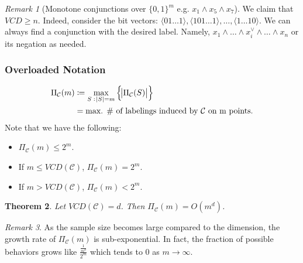 \documentclass[12pt, letterpaper]{article}
\numberwithin{equation}{section} %
\newcommand{\mc}{\mathcal}
\newtheorem{theorem}{Theorem}[section]
\theoremstyle{definition}
\theoremstyle{remark}
\newtheorem{remark}[theorem]{Remark}
\begin{document}
\begin{remark}[Monotone conjunctions over $\lbrace 0,1 \rbrace^m$ e.g. $x_1\land x_5\land x_7$]
    We claim that $VCD \geq n$. Indeed, consider the bit vectors: $\langle01\ldots 1\rangle, \langle 101\ldots 1\rangle, \ldots, \langle1\ldots 10\rangle$. We can always find a conjunction with the desired label. Namely, $x_1\land\ldots \land x_i^\lor\land\ldots\land x_n$ or its negation as needed.
\end{remark}

\subsubsection*{Overloaded Notation}
\begin{align}
    \Pi_{\mc C}(m) &\coloneqq \max\limits_{S\;:\;\abs{S}= m}\left\{\abs{\Pi_{\mc C}(S)}\right\}\\
    &= \textrm{max. \# of labelings induced by $\mc C$ on m points.}
\end{align}
Note that we have the following:
\begin{itemize}
    \item  $\Pi_{\mc C}(m)\leq 2^m$.
    \item If $m\leq VCD(\mc C)$, $\Pi_{\mc C}(m)=2^m$.
    \item If  $m > VCD(\mc C)$, $\Pi_{\mc C}(m) < 2^m$.
\end{itemize}

\begin{theorem}\label{main thm lecture 4}
    Let $VCD(\mc C)=d$. Then $\Pi_{\mc C}(m) = O(m^d)$.
\end{theorem}

\begin{remark}
    As the sample size becomes large compared to the dimension, the growth rate of $\Pi_{\mc C}(m)$ is sub-exponential. In fact, the fraction of possible behaviors grows like $\frac{\frac1{m^d}}{2^m}$ which tends to 0 as $m\to\infty$.
\end{remark}
\end{document}
